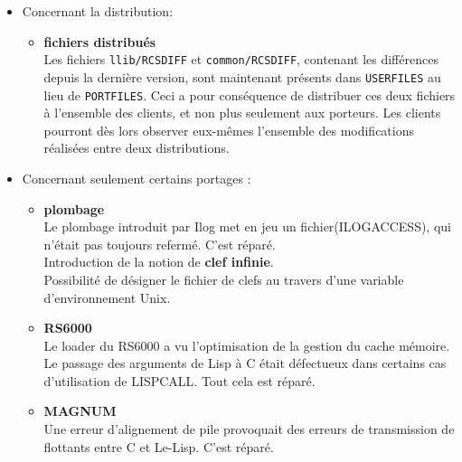 \begin {itemize}
\begin{itemize}
\item Le fichier {\tt C/Machine.h} de chaque portage s'est vu
l\'{e}g\`{e}rement modifi\'{e}, suite \`{a} l'introduction de nouvelles macros
(LLGETCWD,LLBMEMALIGN).
\end{itemize}

\item Concernant la distribution:
\begin{itemize}
\item {\bf fichiers distribu\'{e}s}\\
Les fichiers {\tt llib/RCSDIFF} et {\tt common/RCSDIFF}, contenant les
diff\'{e}rences depuis la derni\`{e}re version, sont
maintenant pr\'{e}sents dans {\tt USERFILES} au lieu de {\tt PORTFILES}.
Ceci a pour cons\'{e}quence de distribuer ces deux fichiers \`{a} l'ensemble
des clients, et non plus seulement aux porteurs. Les clients pourront
d\`{e}s lors observer eux-m\^{e}mes l'ensemble des modifications r\'{e}alis\'{e}es
entre deux distributions.
\end {itemize}

\item Concernant seulement certains portages :
\begin{itemize}
\item {\bf plombage}\\
Le plombage introduit par Ilog met en jeu un fichier(ILOGACCESS), 
qui n'\'{e}tait pas toujours referm\'{e}. C'est r\'{e}par\'{e}.\\
Introduction de la notion de {\bf clef infinie}. \\
Possibilit\'{e} de d\'{e}signer le fichier de clefs au travers d'une
variable d'environnement Unix. 

\item {\bf RS6000}\\
Le loader du RS6000 a vu l'optimisation de la gestion du cache
m\'{e}moire. Le passage des arguments de Lisp \`{a} C \'{e}tait d\'{e}fectueux
dans certains cas d'utilisation de LISPCALL. Tout cela est r\'{e}par\'{e}.

\item {\bf MAGNUM}\\
Une erreur d'alignement de pile provoquait des erreurs de
transmission de flottants entre C et Le-Lisp. C'est r\'{e}par\'{e}.

\end {itemize}
\end{itemize}


